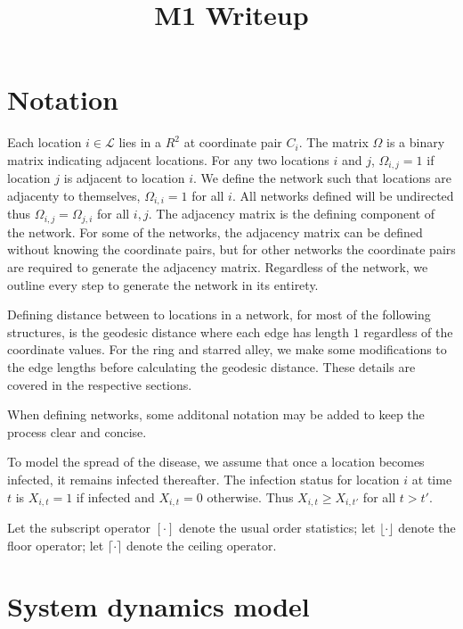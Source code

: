 \documentclass[11pt]{article}
\date{}
\title{M1 Writeup}
\begin{document}
\maketitle
\tableofcontents


\section{Notation}
\label{sec-1}

Each location $i \in \mathcal{L}$ lies in a $R^2$ at coordinate pair
$C_i$.  The matrix $\Omega$ is a binary matrix indicating adjacent
locations.  For any two locations $i$ and $j$, $\Omega_{i,j} = 1$ if
location $j$ is adjacent to location $i$.  We define the network such
that locations are adjacenty to themselves, $\Omega_{i,i} = 1$ for all
$i$.  All networks defined will be undirected thus $\Omega_{i,j} =
  \Omega_{j,i}$ for all $i,j$.  The adjacency matrix is the defining
component of the network.  For some of the networks, the adjacency
matrix can be defined without knowing the coordinate pairs, but for
other networks the coordinate pairs are required to generate the
adjacency matrix.  Regardless of the network, we outline every step to
generate the network in its entirety.

Defining distance between to locations in a network, for most of the
following structures, is the geodesic distance where each edge has
length $1$ regardless of the coordinate values.  For the ring and
starred alley, we make some modifications to the edge lengths before
calculating the geodesic distance.  These details are covered in the
respective sections.

When defining networks, some additonal notation may be added to keep
the process clear and concise.

To model the spread of the disease, we assume that once a location
becomes infected, it remains infected thereafter.  The infection
status for location $i$ at time $t$ is $X_{i,t} = 1$ if infected and
$X_{i,t} = 0$ otherwise.  Thus $X_{i,t} \ge X_{i,t'}$ for all $t > t'$.

Let the subscript operator $[\cdot]$ denote the usual order
statistics; let $\lfloor \cdot \rfloor$ denote the floor operator; let
$\lceil \cdot \rceil$ denote the ceiling operator.


\section{System dynamics model}
\label{sec-2}
\end{document}
